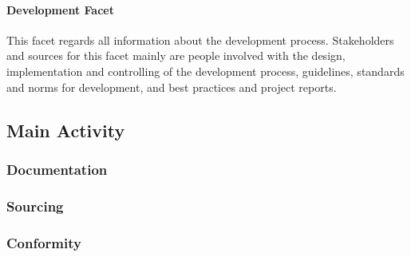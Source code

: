 \paragraph*{Development Facet}
This facet regards all information about the development process. Stakeholders and sources for this facet mainly are people involved with the design, implementation and controlling of the development process, guidelines, standards and norms for development, and best practices and project reports. \parencite[see.][79]{Pohl.2007}
\subsection{Main Activity}

\subsubsection*{Documentation}
\subsubsection*{Sourcing}
\subsubsection*{Conformity}
